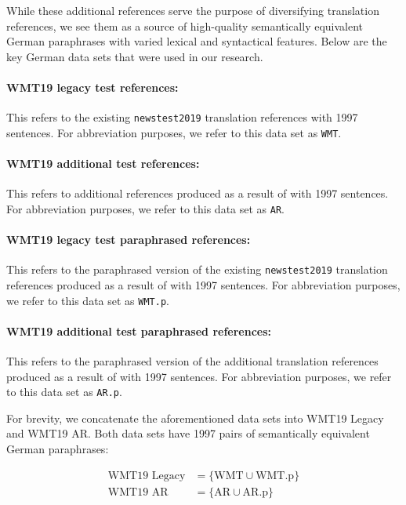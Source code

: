 \documentclass[11pt,a4paper]{article}
\begin{document}
While these additional references serve the purpose of diversifying translation
references, we see them as a source of high-quality semantically equivalent
German paraphrases with varied lexical and syntactical features. Below are the
key German data sets that were used in our research.

\paragraph{WMT19 legacy test references:} This refers to the existing
\texttt{newstest2019} translation references with 1997 sentences. For
abbreviation purposes, we refer to this data set as \texttt{WMT}.

\paragraph{WMT19 additional test references:} This refers to additional
references produced as a result of
\citet{freitag-bleu-paraphrase-references-2020} with 1997 sentences. For
abbreviation purposes, we refer to this data set as \texttt{AR}.

\paragraph{WMT19 legacy test paraphrased references:} This refers to the
paraphrased version of the existing \texttt{newstest2019} translation references
produced as a result of \citet{freitag-bleu-paraphrase-references-2020} with
1997 sentences. For abbreviation purposes, we refer to this data set as
\texttt{WMT.p}.

\paragraph{WMT19 additional test paraphrased references:}This refers to the
paraphrased version of the additional translation references produced as a
result of \citet{freitag-bleu-paraphrase-references-2020} with 1997 sentences.
For abbreviation purposes, we refer to this data set as \texttt{AR.p}.

For brevity, we concatenate the aforementioned data sets into WMT19 Legacy and
WMT19 AR. Both data sets have 1997 pairs of semantically equivalent German
paraphrases:

\vspace{-10pt}
\begin{align}
  \text{WMT19 Legacy} &= \{\text{WMT} \cup \text{WMT.p} \} \label{wmt19legacy} \\
  \text{WMT19 AR} &= \{\text{AR} \cup \text{AR.p} \} \label{wmt19ar}
\end{align}
\end{document}
